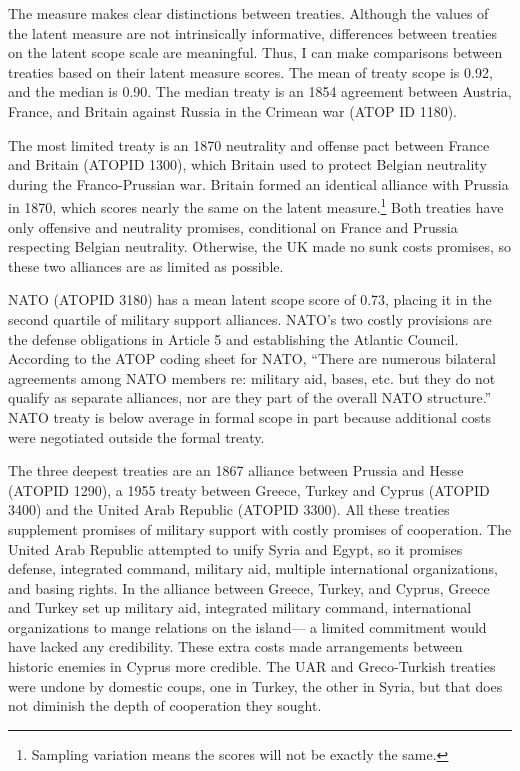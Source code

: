 \documentclass[12pt]{article}
\begin{document}
The measure makes clear distinctions between treaties. 
Although the values of the latent measure are not intrinsically informative, differences between treaties on the latent scope scale are meaningful. 
Thus, I can make comparisons between treaties based on their latent measure scores. 
The mean of treaty scope is 0.92, and the median is 0.90. 
The median treaty is an 1854 agreement between Austria, France, and Britain against Russia in the Crimean war (ATOP ID 1180). 


The most limited treaty is an 1870 neutrality and offense pact between France and Britain (ATOPID 1300), which Britain used to protect Belgian neutrality during the Franco-Prussian war.  
Britain formed an identical alliance with Prussia in 1870, which scores nearly the same on the latent measure.\footnote{
Sampling variation means the scores will not be exactly the same.} 
Both treaties have only offensive and neutrality promises, conditional on France and Prussia respecting Belgian neutrality. 
Otherwise, the UK made no sunk costs promises, so these two alliances are as limited as possible. 


NATO (ATOPID 3180) has a mean latent scope score of 0.73, placing it in the second quartile of military support alliances. 
NATO's two costly provisions are the defense obligations in Article 5 and establishing the Atlantic Council. 
According to the ATOP coding sheet for NATO, ``There are numerous bilateral agreements among NATO members re: military aid, bases, etc. but they do not qualify as separate alliances, nor are they part of the overall NATO structure.''
NATO treaty is below average in formal scope in part because additional costs were negotiated outside the formal treaty.    


The three deepest treaties are an 1867 alliance between Prussia and Hesse (ATOPID 1290), a 1955 treaty between Greece, Turkey and Cyprus (ATOPID 3400) and the United Arab Republic (ATOPID 3300).  
All these treaties supplement promises of military support with costly promises of cooperation. 
The United Arab Republic attempted to unify Syria and Egypt, so it promises defense, integrated command, military aid, multiple international organizations, and basing rights. 
In the alliance between Greece, Turkey, and Cyprus, Greece and Turkey set up military aid, integrated military command, international organizations to mange relations on the island--- a limited commitment would have lacked any credibility. 
These extra costs made arrangements between historic enemies in Cyprus more credible. 
The UAR and Greco-Turkish treaties were undone by domestic coups, one in Turkey, the other in Syria, but that does not diminish the depth of cooperation they sought. 
\end{document}
